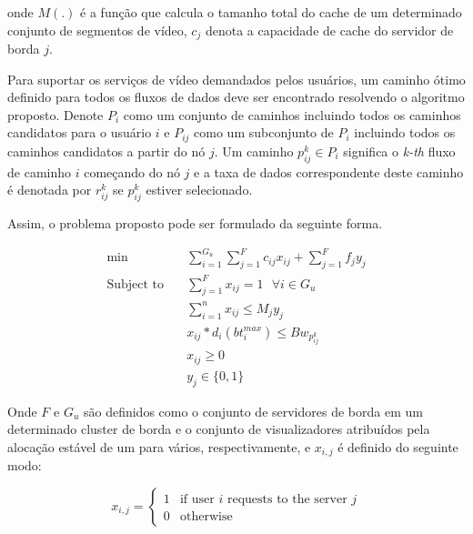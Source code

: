 onde $M(.)$ é a função que calcula o tamanho total do cache de um determinado conjunto de segmentos de vídeo, $c_j$ denota a capacidade de cache do servidor de borda $j$.

Para suportar os serviços de vídeo demandados pelos usuários, um caminho ótimo definido para todos os fluxos de dados deve ser encontrado resolvendo o algoritmo proposto. Denote $P_{i}$ como um conjunto de caminhos incluindo todos os caminhos candidatos para o usuário $i$ e $P_{ij}$ como um subconjunto de $P_{i}$ incluindo todos os caminhos candidatos a partir do nó $j$. Um caminho $p_{ij}^{k} \in P_{i}$ significa o \textit{k-th} fluxo de caminho $i$ começando do nó $j$ e a taxa de dados correspondente deste caminho é denotada por $r_{ ij}^{k}$ se $p_{ij}^{k}$ estiver selecionado.

Assim, o problema proposto pode ser formulado da seguinte forma.

\begin{equation} 
\begin{aligned}
\min{} \quad &
\sum^{G_u}_{i=1}\sum^{F}_{j=1} c_{ij}x_{ij} + \sum^{F}_{j=1} f_{j} y_{j} \\
%
\text{Subject to} \quad & 
\sum^{F}_{j=1} x_{ij} = 1 \text{ } \forall i \in G_u \\
&
\sum^{n}_{i=1} x_{ij} \leq M_{j}y_{j} \\
&
x_{ij} * d_{i}( bt_{i}^{max}) \leq Bw_{p_{ij}^{k}} \\
&
x_{ij} \geq 0 \\
&
y_{j} \in \{0,1\} 
\end{aligned}
\end{equation}

Onde $F$ e $G_u$ são definidos como o conjunto de servidores de borda em um determinado cluster de borda e o conjunto de visualizadores atribuídos pela alocação estável de um para vários, respectivamente, e $x_{i,j}$ é definido do seguinte modo:

\begin{equation}\label{total_capacity_loss}
x_{i,j} =
\begin{cases}
1 & \text{if user } i \text{ requests to the server } j \\ 
0 & \text{otherwise }
\end{cases}
\end{equation}




